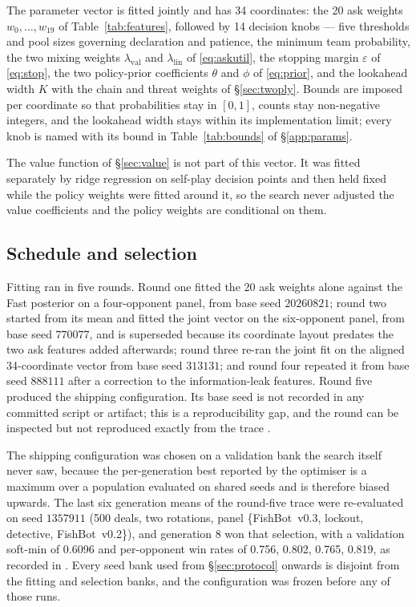 \documentclass[11pt]{article}
\theoremstyle{definition}
\DeclareRobustCommand{\vthree}{\texorpdfstring{\mbox{FishBot v0.3}}{FishBot v0.3}}
\DeclareRobustCommand{\vtwo}{\texorpdfstring{\mbox{FishBot v0.2}}{FishBot v0.2}}
\newcommand{\numSelectedGen}{8}
\newcommand{\numParams}{34}
\newcommand{\numAskFeats}{20}
\newcommand{\numKnobs}{14}
\newcommand{\numSelectSoftmin}{0.6096}
\newcommand{\numSelectPerOpp}{0.756, 0.802, 0.765, 0.819}
\begin{document}
The parameter vector is fitted jointly and has \numParams{} coordinates: the
\numAskFeats{} ask weights $w_0,\dots,w_{19}$ of Table~\ref{tab:features},
followed by \numKnobs{} decision knobs --- five thresholds and pool sizes
governing declaration and patience, the minimum team probability, the two mixing
weights $\lambda_{\mathrm{val}}$ and $\lambda_{\mathrm{lin}}$ of
\eqref{eq:askutil}, the stopping margin $\varepsilon$ of \eqref{eq:stop}, the two
policy-prior coefficients $\theta$ and $\phi$ of \eqref{eq:prior}, and the
lookahead width $K$ with the chain and threat weights of \S\ref{sec:twoply}.
Bounds are imposed per coordinate so that probabilities stay in $[0,1]$, counts
stay non-negative integers, and the lookahead width stays within its
implementation limit; every knob is named with its bound in
Table~\ref{tab:bounds} of \S\ref{app:params}.

The value function of \S\ref{sec:value} is not part of this vector. It was fitted
separately by ridge regression on self-play decision points and then held fixed
while the policy weights were fitted around it, so the search never adjusted the
value coefficients and the policy weights are conditional on them.

\subsection{Schedule and selection}

Fitting ran in five rounds. Round one fitted the \numAskFeats{} ask weights alone
against the Fast posterior on a four-opponent panel, from base seed $20260821$;
round two started from its mean and fitted the joint vector on the six-opponent
panel, from base seed $770077$, and is superseded because its coordinate layout
predates the two ask features added afterwards; round three re-ran the joint fit
on the aligned \numParams{}-coordinate vector from base seed $313131$; and round
four repeated it from base seed $888111$ after a correction to the
information-leak features. Round five produced the shipping configuration. Its
base seed is not recorded in any committed script or artifact; this is a
reproducibility gap, and the round can be inspected but not reproduced exactly
from the trace .

The shipping configuration was chosen on a validation bank the search itself
never saw, because the per-generation best reported by the optimiser is a maximum
over a population evaluated on shared seeds and is therefore biased upwards. The
last six generation means of the round-five trace were re-evaluated on seed
$1357911$ (500 deals, two rotations, panel \{\vthree{}, lockout, detective,
\vtwo{}\}), and generation \numSelectedGen{} won that selection, with a
validation soft-min of \numSelectSoftmin{} and per-opponent win rates of
\numSelectPerOpp{}, as recorded in .
Every seed bank used from \S\ref{sec:protocol} onwards is disjoint from the
fitting and selection banks, and the configuration was frozen before any of those
runs.
\end{document}
